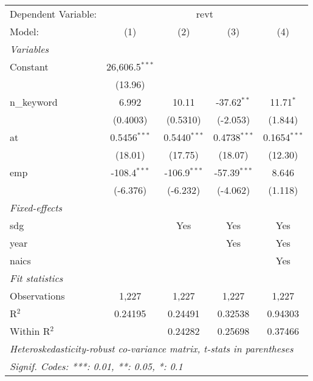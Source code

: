 
\begingroup
\centering
\begin{tabular}{lcccc}
   \tabularnewline \midrule \midrule
   Dependent Variable: & \multicolumn{4}{c}{revt}\\
   Model:       & (1)              & (2)            & (3)            & (4)\\  
   \midrule
   \emph{Variables}\\
   Constant     & 26,606.5$^{***}$ &                &                &   \\   
                & (13.96)          &                &                &   \\   
   n\_keyword   & 6.992            & 10.11          & -37.62$^{**}$  & 11.71$^{*}$\\   
                & (0.4003)         & (0.5310)       & (-2.053)       & (1.844)\\   
   at           & 0.5456$^{***}$   & 0.5440$^{***}$ & 0.4738$^{***}$ & 0.1654$^{***}$\\   
                & (18.01)          & (17.75)        & (18.07)        & (12.30)\\   
   emp          & -108.4$^{***}$   & -106.9$^{***}$ & -57.39$^{***}$ & 8.646\\   
                & (-6.376)         & (-6.232)       & (-4.062)       & (1.118)\\   
   \midrule
   \emph{Fixed-effects}\\
   sdg          &                  & Yes            & Yes            & Yes\\  
   year         &                  &                & Yes            & Yes\\  
   naics        &                  &                &                & Yes\\  
   \midrule
   \emph{Fit statistics}\\
   Observations & 1,227            & 1,227          & 1,227          & 1,227\\  
   R$^2$        & 0.24195          & 0.24491        & 0.32538        & 0.94303\\  
   Within R$^2$ &                  & 0.24282        & 0.25698        & 0.37466\\  
   \midrule \midrule
   \multicolumn{5}{l}{\emph{Heteroskedasticity-robust co-variance matrix, t-stats in parentheses}}\\
   \multicolumn{5}{l}{\emph{Signif. Codes: ***: 0.01, **: 0.05, *: 0.1}}\\
\end{tabular}
\par\endgroup


